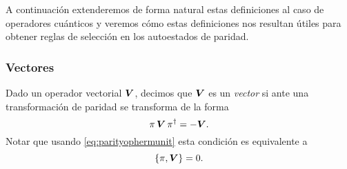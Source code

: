 \documentclass[10pt, a4paper]{article}
\numberwithin{equation}{subsection}
\begin{document}
A continuación extenderemos de forma natural estas definiciones al caso de
operadores cuánticos y veremos cómo estas definiciones nos resultan útiles para
obtener reglas de selección en los autoestados de paridad.

\subsubsection{Vectores}
Dado un operador vectorial $\vb*{V}$, decimos que $\vb*{V}$ es un
\emph{vector} si ante una transformación de paridad se transforma de la forma
\begin{equation} \label{eq:defvect}
  \pi\,\vb*{V}\,\pi^\dagger = -\vb*{V}.
\end{equation}
Notar que usando \eqref{eq:parityophermunit} esta condición es equivalente a
\begin{equation} \label{eq:defvectacomm}
  \acomm{\parityop}{\vect{V}} = 0.
\end{equation}
\end{document}
